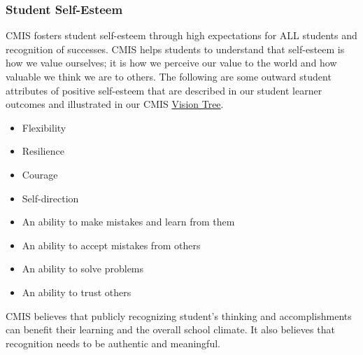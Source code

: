 \subsubsection{Student Self-Esteem}



\begin{findings}
CMIS fosters student self-esteem through high expectations for ALL students and recognition of successes.
CMIS helps students to understand that self-esteem is how we value ourselves; it is how we perceive our value to the world and how valuable we think we are to others. The following are some outward student attributes of positive self-esteem that are described in our student learner outcomes and illustrated in our CMIS \href{http://cmis.ac.th/about/vision}{Vision Tree}. 

\begin{itemize}
\item Flexibility
\item Resilience
\item Courage
\item Self-direction 
\item An ability to make mistakes and learn from them 
\item An ability to accept mistakes from others 
\item An ability to solve problems 
\item An ability to trust others 
\end{itemize}

CMIS believes that publicly recognizing student’s thinking and accomplishments can benefit their learning and the overall school climate. It also believes that recognition needs to be authentic and meaningful.


\end{findings}
